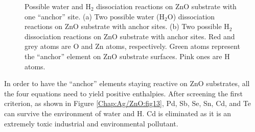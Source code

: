 \newpage
\begingroup
\begin{figure}[!ht]
  \centering
  \label{Chap:Ag/ZnO:fig:12a}
  \label{Chap:Ag/ZnO:fig:12b}
\caption[Possible water and $\text{H}_{\text{2}}$ dissociation reactions on ZnO substrate with ``anchor'' sites.]{Possible water and $\text{H}_{\text{2}}$ dissociation reactions on ZnO substrate with one ``anchor'' site. (a) Two possible water ($\text{H}_{\text{2}}\text{O}$) dissociation reactions on ZnO substrate with anchor sites. (b) Two possible $\text{H}_{\text{2}}$ dissociation reactions on ZnO substrate with anchor sites. Red and grey atoms are O and Zn atoms, respectively. Green atoms represent the ``anchor'' element on ZnO substrate surfaces. Pink ones are H atoms.}
\label{Chap:Ag/ZnO:fig12}
\end{figure}
\endgroup

In order to have the ``anchor'' elements staying reactive on ZnO substrates, all the four equations need to yield positive enthalpies. After screening the first criterion, as shown in Figure \ref{Chap:Ag/ZnO:fig13}, Pd, Sb, Se, Sn, Cd, and Te can survive the environment of water and H. Cd is eliminated as it is an extremely toxic industrial and environmental pollutant.

